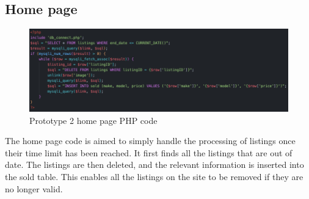 \subsection{Home page}
\begin{figure}[H]
    \centering
    \includegraphics[scale=0.5]{ch3_developing/proto2/proto2_home.png}
    \caption{Prototype 2 home page PHP code}
    \label{fig:proto2_home}
\end{figure}
The home page code is aimed to simply handle the processing of listings once their time limit has been reached. It first finds all the listings that are out of date. The listings are then deleted, and the relevant information is inserted into the sold table. This enables all the listings on the site to be removed if they are no longer valid. 

